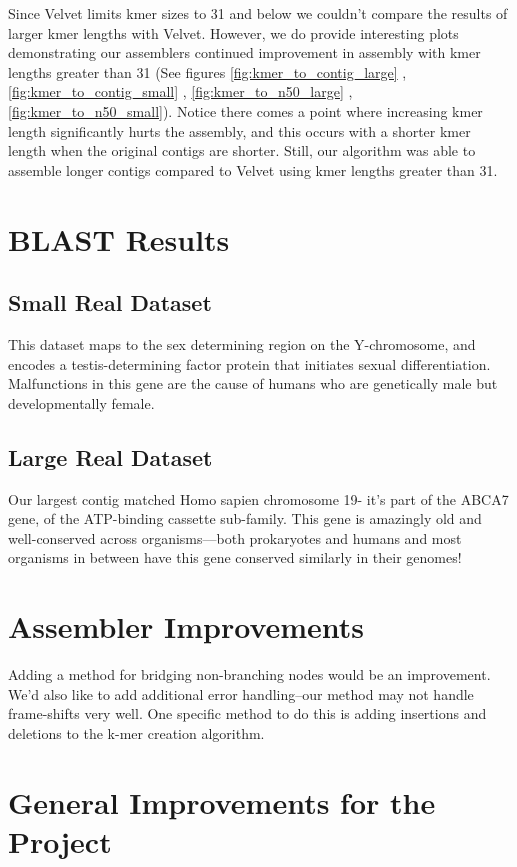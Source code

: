 \documentclass[12pt]{article}
\begin{document}
Since Velvet limits kmer sizes to 31 and below we couldn't compare the results of larger kmer lengths with Velvet. However, we do provide interesting plots demonstrating our assemblers continued improvement in assembly with kmer lengths greater than 31 (See figures \ref{fig:kmer_to_contig_large} , \ref{fig:kmer_to_contig_small} , \ref{fig:kmer_to_n50_large} , \ref{fig:kmer_to_n50_small}). Notice there comes a point where increasing kmer length significantly hurts the assembly, and this occurs with a shorter kmer length when the original contigs are shorter. Still, our algorithm was able to assemble longer contigs compared to Velvet using kmer lengths greater than 31.

\section{BLAST Results}
\subsection{Small Real Dataset}
This dataset maps to the sex determining region on the Y-chromosome, and encodes a testis-determining factor protein that initiates sexual differentiation.  Malfunctions in this gene are the cause of humans who are genetically male but developmentally female.

\subsection{Large Real Dataset}
Our largest contig matched Homo sapien chromosome 19- it’s part of the ABCA7 gene, of the ATP-binding cassette sub-family.  This gene is amazingly old and well-conserved across organisms---both prokaryotes and humans and most organisms in between have this gene conserved similarly in their genomes!

\section{Assembler Improvements}
Adding a method for bridging non-branching nodes would be an improvement.  We’d also like to add additional error handling--our method may not handle frame-shifts very well.  One specific method to do this is adding insertions and deletions to the k-mer creation algorithm.

\section{General Improvements for the Project}
\end{document}
